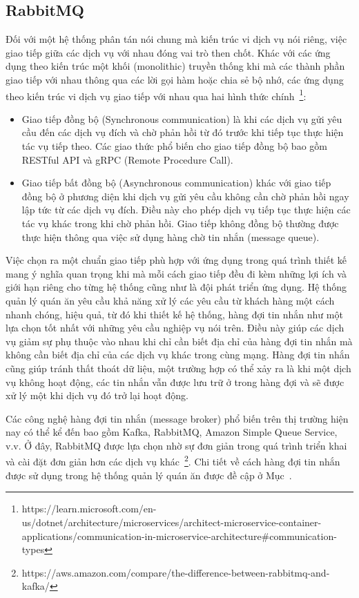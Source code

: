\subsection{RabbitMQ}
Đối với một hệ thống phân tán nói chung mà kiến trúc vi dịch vụ nói riêng, việc giao tiếp giữa các dịch vụ với nhau đóng vai trò then chốt.
Khác với các ứng dụng theo kiến trúc một khối (monolithic) truyền thống khi mà các thành phần giao tiếp với nhau thông qua các lời gọi hàm hoặc chia sẻ bộ nhớ, các ứng dụng theo kiến trúc vi dịch vụ giao tiếp với nhau qua hai hình thức chính~\footnote{https://learn.microsoft.com/en-us/dotnet/architecture/microservices/architect-microservice-container-applications/communication-in-microservice-architecture\#communication-types}:
\begin{itemize}
    \item Giao tiếp đồng bộ (Synchronous communication) là khi các dịch vụ gửi yêu cầu đến các dịch vụ đích và chờ phản hồi từ đó trước khi tiếp tục thực hiện tác vụ tiếp theo. Các giao thức phổ biến cho giao tiếp đồng bộ bao gồm RESTful API và gRPC (Remote Procedure Call).
    \item Giao tiếp bất đồng bộ (Asynchronous communication) khác với giao tiếp đồng bộ ở phương diện khi dịch vụ gửi yêu cầu không cần chờ phản hồi ngay lập tức từ các dịch vụ đích.
    Điều này cho phép dịch vụ tiếp tục thực hiện các tác vụ khác trong khi chờ phản hồi.
    Giao tiếp không đồng bộ thường được thực hiện thông qua việc sử dụng hàng chờ tin nhắn (message queue).
\end{itemize}
Việc chọn ra một chuẩn giao tiếp phù hợp với ứng dụng trong quá trình thiết kế mang ý nghĩa quan trọng khi mà mỗi cách giao tiếp đều đi kèm những lợi ích và giới hạn riêng cho từng hệ thống cũng như là đội phát triển ứng dụng.
Hệ thống quản lý quán ăn yêu cầu khả năng xử lý các yêu cầu từ khách hàng một cách nhanh chóng, hiệu quả, từ đó khi thiết kế hệ thống, hàng đợi tin nhắn như một lựa chọn tốt nhất với những yêu cầu nghiệp vụ nói trên.
Điều này giúp các dịch vụ giảm sự phụ thuộc vào nhau khi chỉ cần biết địa chỉ của hàng đợi tin nhắn mà không cần biết địa chỉ của các dịch vụ khác trong cùng mạng.
Hàng đợi tin nhắn cũng giúp tránh thất thoát dữ liệu, một trường hợp có thể xảy ra là khi một dịch vụ không hoạt động, các tin nhắn vẫn được lưu trữ ở trong hàng đợi và sẽ được xử lý một khi dịch vụ đó trở lại hoạt động.

Các công nghệ hàng đợi tin nhắn (message broker) phổ biến trên thị trường hiện nay có thể kể đến bao gồm Kafka, RabbitMQ, Amazon Simple Queue Service, v.v.
Ở đây, RabbitMQ được lựa chọn nhờ sự đơn giản trong quá trình triển khai và cài đặt đơn giản hơn các dịch vụ khác~\footnote{https://aws.amazon.com/compare/the-difference-between-rabbitmq-and-kafka/}.
Chi tiết về cách hàng đợi tin nhắn được sử dụng trong hệ thống quản lý quán ăn được đề cập ở Mục~.
